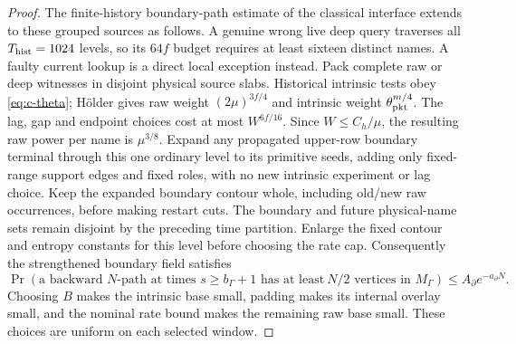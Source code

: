 \begin{proof}
The finite-history boundary-path estimate of the classical interface
extends to these grouped sources as follows. A genuine wrong live deep
query traverses all \(T_{\rm hist}=1024\) levels, so its \(64f\) budget requires
at least sixteen distinct names. A faulty current lookup is a direct
local exception instead. Pack complete raw or deep witnesses in disjoint
physical source slabs. Historical intrinsic tests obey
\eqref{eq:c-theta}; Hölder gives raw weight \((2\mu)^{3f/4}\) and
intrinsic weight \(\theta_{\rm pkt}^{m/4}\). The lag, gap and endpoint choices
cost at most \(W^{6f/16}\). Since \(W\le C_h/\mu\), the resulting raw
power per name is \(\mu^{3/8}\). Expand any propagated upper-row boundary terminal through this one
ordinary level to its primitive seeds, adding only fixed-range support
edges and fixed roles, with no new intrinsic experiment or lag choice.
Keep the expanded boundary contour whole, including old/new raw
occurrences, before making restart cuts. The boundary and future
physical-name sets remain disjoint by the preceding time partition.
Enlarge the fixed contour and entropy constants for this level before
choosing the rate cap. Consequently the strengthened boundary field
satisfies
\[
 \Pr(\text{a backward }N\text{-path at times }s\ge b_\Gamma+1\text{ has at least}
              \ N/2\text{ vertices in }M_\Gamma)
 \le A_\partial e^{-a_\partial N}.
\]
Choosing \(B\) makes the intrinsic base small, padding makes its
internal overlay small, and the nominal rate bound makes the remaining
raw base small. These choices are uniform on each selected window.


\end{proof}
